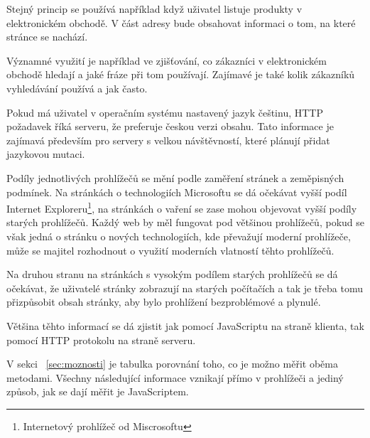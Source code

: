 \documentclass[bc,female,java,dept456]{diploma}						%
\begin{document}
\bigskip

Stejný princip se používá například když uživatel listuje produkty v elektronickém obchodě. V část adresy bude obsahovat informaci o tom, na které stránce se nachází.

Významné využití je například ve zjišťování, co zákazníci v elektronickém obchodě hledají a jaké fráze při tom používají. Zajímavé je také kolik zákazníků vyhledávání používá a jak často.


Pokud má uživatel v operačním systému nastavený jazyk češtinu, HTTP požadavek říká serveru, že preferuje českou verzi obsahu. Tato informace je zajímavá především pro servery s velkou návštěvností, které plánují přidat jazykovou mutaci.



Podíly jednotlivých prohlížečů se mění podle zaměření stránek a zeměpisných podmínek. Na stránkách o technologiích Microsoftu se dá očekávat vyšší podíl Internet Exploreru\footnote{Internetový prohlížeč od Miscrosoftu}, na stránkách o vaření se zase mohou objevovat vyšší podíly starých prohlížečů. Každý web by měl fungovat pod většinou prohlížečů, pokud se však jedná o stránku o nových technologiích, kde převažují moderní prohlížeče, může se majitel rozhodnout o využití moderních vlatností těhto prohlížečů.

Na druhou stranu na stránkách s vysokým podílem starých prohlížečů se dá očekávat, že uživatelé stránky zobrazují na starých počítačích a tak je třeba tomu přizpůsobit obsah stránky, aby bylo prohlížení bezproblémové a plynulé.


Většina těhto informací se dá zjistit jak pomocí JavaScriptu na straně klienta, tak pomocí HTTP protokolu na straně serveru.

V sekci ~\ref{sec:moznosti} je tabulka porovnání toho, co je možno měřit oběma metodami. Všechny následující informace vznikají přímo v prohlížeči a jediný způsob, jak se dají měřit je JavaScriptem.
\end{document}
